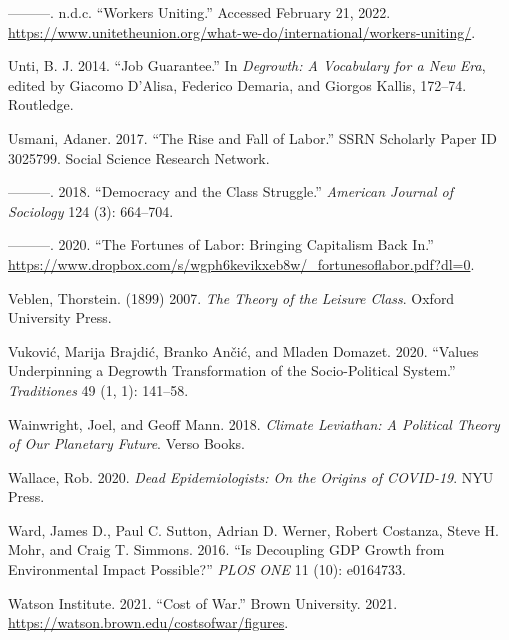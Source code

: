 \documentclass[a4paper, nobind]{templates/ociamthesis}
\newlength{\cslhangindent}
\newenvironment{CSLReferences}[2] %
 {%
  \setlength{\parindent}{0pt}
  \ifodd #1
  \let\oldpar\par
  \def\par{\hangindent=\cslhangindent\oldpar}
  \fi
  \setlength{\parskip}{1mm}
  \setlength{\baselineskip}{6mm}
 }%
 {}
\begin{document}
\begin{CSLReferences}{1}{0}
\leavevmode{}%
---------. n.d.c. {``Workers {Uniting}.''} Accessed February 21, 2022. \url{https://www.unitetheunion.org/what-we-do/international/workers-uniting/}.

\leavevmode{}%
Unti, B. J. 2014. {``Job {Guarantee}.''} In \emph{Degrowth: {A Vocabulary} for a {New Era}}, edited by Giacomo D'Alisa, Federico Demaria, and Giorgos Kallis, 172--74. {Routledge}.

\leavevmode{}%
Usmani, Adaner. 2017. {``The {Rise} and {Fall} of {Labor}.''} SSRN Scholarly Paper ID 3025799. {Social Science Research Network}.

\leavevmode{}%
---------. 2018. {``Democracy and the Class Struggle.''} \emph{American Journal of Sociology} 124 (3): 664--704.

\leavevmode{}%
---------. 2020. {``The {Fortunes} of {Labor}: {Bringing Capitalism Back In}.''} \url{https://www.dropbox.com/s/wgph6kevikxeb8w/_fortunesoflabor.pdf?dl=0}.

\leavevmode{}%
Veblen, Thorstein. (1899) 2007. \emph{The {Theory} of the {Leisure Class}}. {Oxford University Press}.

\leavevmode{}%
Vuković, Marija Brajdić, Branko Ančić, and Mladen Domazet. 2020. {``Values {Underpinning} a {Degrowth Transformation} of the {Socio-Political System}.''} \emph{Traditiones} 49 (1, 1): 141--58.

\leavevmode{}%
Wainwright, Joel, and Geoff Mann. 2018. \emph{Climate {Leviathan}: {A Political Theory} of {Our Planetary Future}}. {Verso Books}.

\leavevmode{}%
Wallace, Rob. 2020. \emph{Dead {Epidemiologists}: {On} the {Origins} of {COVID-19}}. {NYU Press}.

\leavevmode{}%
Ward, James D., Paul C. Sutton, Adrian D. Werner, Robert Costanza, Steve H. Mohr, and Craig T. Simmons. 2016. {``Is {Decoupling GDP Growth} from {Environmental Impact Possible}?''} \emph{PLOS ONE} 11 (10): e0164733.

\leavevmode{}%
Watson Institute. 2021. {``Cost of {War}.''} {Brown University}. 2021. \url{https://watson.brown.edu/costsofwar/figures}.


\end{CSLReferences}
\end{document}
